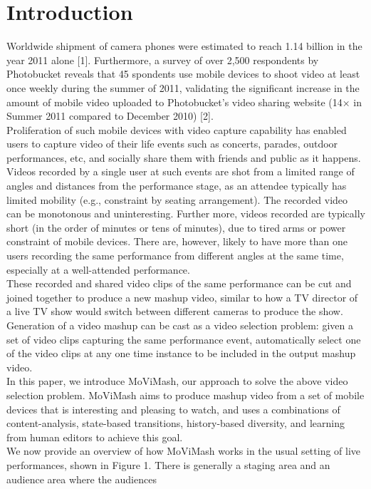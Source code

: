\documentclass{sig-alternate}
\begin{document}
\section{Introduction}
Worldwide shipment of camera phones were estimated to reach
1.14 billion in the year 2011 alone [1]. Furthermore, a survey of
over 2,500 respondents by Photobucket reveals that 45%
spondents use mobile devices to shoot video at least once weekly
during the summer of 2011, validating the significant increase in
the amount of mobile video uploaded to Photobucket’s video sharing website (14× in Summer 2011 compared to December 2010) [2].\\
Proliferation of such mobile devices with video capture capability has enabled users to capture video of their life events such
as concerts, parades, outdoor performances, etc, and socially share
them with friends and public as it happens. Videos recorded by
a single user at such events are shot from a limited range of angles and distances from the performance stage, as an attendee typically has limited mobility (e.g., constraint by seating arrangement).
The recorded video can be monotonous and uninteresting. Further more, videos recorded are typically short (in the order of minutes
or tens of minutes), due to tired arms or power constraint of mobile
devices. There are, however, likely to have more than one users
recording the same performance from different angles at the same
time, especially at a well-attended performance.\\
These recorded and shared video clips of the same performance
can be cut and joined together to produce a new mashup video,
similar to how a TV director of a live TV show would switch between different cameras to produce the show. Generation of a video
mashup can be cast as a video selection problem: given a set of
video clips capturing the same performance event, automatically
select one of the video clips at any one time instance to be included
in the output mashup video.\\
In this paper, we introduce MoViMash, our approach to solve
the above video selection problem. MoViMash aims to produce
mashup video from a set of mobile devices that is interesting and
pleasing to watch, and uses a combinations of content-analysis,
state-based transitions, history-based diversity, and learning from
human editors to achieve this goal.\\
We now provide an overview of how MoViMash works in the
usual setting of live performances, shown in Figure 1. There is
generally a staging area and an audience area where the audiences
\end{document}
